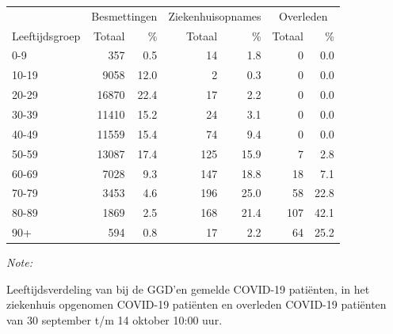 \documentclass[
  english,
  man,floatsintext]{apa6}
\begin{document}
\begin{table}[H]
\centering\begingroup\fontsize{11}{13}\selectfont

\begin{threeparttable}
\begin{tabular}{lrrrrrr}
\toprule
\multicolumn{1}{c}{ } & \multicolumn{2}{c}{Besmettingen} & \multicolumn{2}{c}{Ziekenhuisopnames} & \multicolumn{2}{c}{Overleden} \\
\cmidrule(l{3pt}r{3pt}){2-3} \cmidrule(l{3pt}r{3pt}){4-5} \cmidrule(l{3pt}r{3pt}){6-7}
Leeftijdsgroep & Totaal & \% & Totaal & \% & Totaal & \%\\
\midrule
0-9 & 357 & 0.5 & 14 & 1.8 & 0 & 0.0\\
10-19 & 9058 & 12.0 & 2 & 0.3 & 0 & 0.0\\
20-29 & 16870 & 22.4 & 17 & 2.2 & 0 & 0.0\\
30-39 & 11410 & 15.2 & 24 & 3.1 & 0 & 0.0\\
40-49 & 11559 & 15.4 & 74 & 9.4 & 0 & 0.0\\
50-59 & 13087 & 17.4 & 125 & 15.9 & 7 & 2.8\\
60-69 & 7028 & 9.3 & 147 & 18.8 & 18 & 7.1\\
70-79 & 3453 & 4.6 & 196 & 25.0 & 58 & 22.8\\
80-89 & 1869 & 2.5 & 168 & 21.4 & 107 & 42.1\\
90+ & 594 & 0.8 & 17 & 2.2 & 64 & 25.2\\
\bottomrule
\end{tabular}
\begin{tablenotes}
\item \textit{Note: } 
\item Leeftijdsverdeling van bij de GGD’en gemelde COVID-19 patiënten, in het ziekenhuis opgenomen COVID-19 patiënten en overleden COVID-19 patiënten van 30 september t/m 14 oktober 10:00 uur.
\end{tablenotes}
\end{threeparttable}
\endgroup{}
\end{table}
\end{document}
